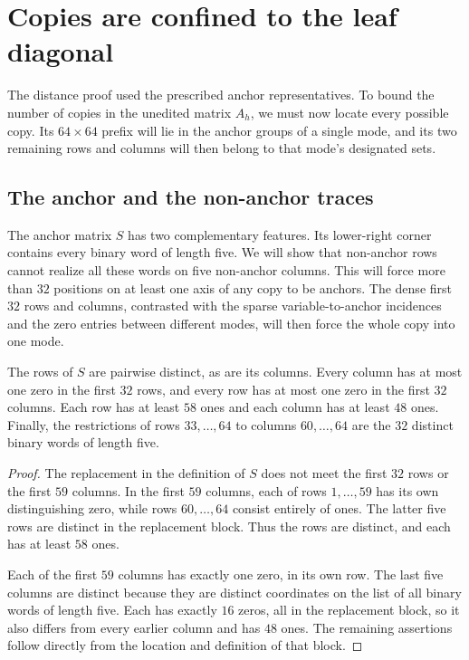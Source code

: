 \section{Copies are confined to the leaf diagonal}
\label{sec:copies}

The distance proof used the prescribed anchor representatives. To
bound the number of copies in the unedited matrix $A_h$, we must now
locate every possible copy. Its $64\times64$ prefix will lie in the
anchor groups of a single mode, and its two remaining rows and columns
will then belong to that mode's designated sets.

\subsection{The anchor and the non-anchor traces}

The anchor matrix $S$ has two complementary features. Its lower-right
corner contains every binary word of length five. We will show that
non-anchor rows cannot realize all these words on five non-anchor
columns. This will force more than $32$ positions on at least one axis of any copy to be anchors.
The dense first $32$ rows and columns, contrasted with the sparse
variable-to-anchor incidences and the zero entries between different
modes, will then force the whole copy into one mode.

\begin{lemma}
\label{lem:anchor-properties}
The rows of $S$ are pairwise distinct, as are its columns. Every column
has at most one zero in the first $32$ rows, and every row has at most
one zero in the first $32$ columns. Each row has at least $58$ ones and
each column has at least $48$ ones. Finally, the restrictions of rows
$33,\ldots,64$ to columns $60,\ldots,64$ are the $32$ distinct binary
words of length five.
\end{lemma}

\begin{proof}
The replacement in the definition of $S$ does not meet the first
$32$ rows or the first $59$ columns. In the first $59$ columns, each
of rows $1,\ldots,59$ has its own distinguishing zero, while rows
$60,\ldots,64$ consist entirely of ones. The latter five rows are
distinct in the replacement block. Thus the rows are distinct, and
each has at least $58$ ones.

Each of the first $59$ columns has exactly one zero, in its own row.
The last five columns are distinct because they are distinct
coordinates on the list of all binary words of length five. Each has
exactly $16$ zeros, all in the replacement block, so it also differs
from every earlier column and has $48$ ones. The remaining assertions
follow directly from the location and definition of that block.
\end{proof}

